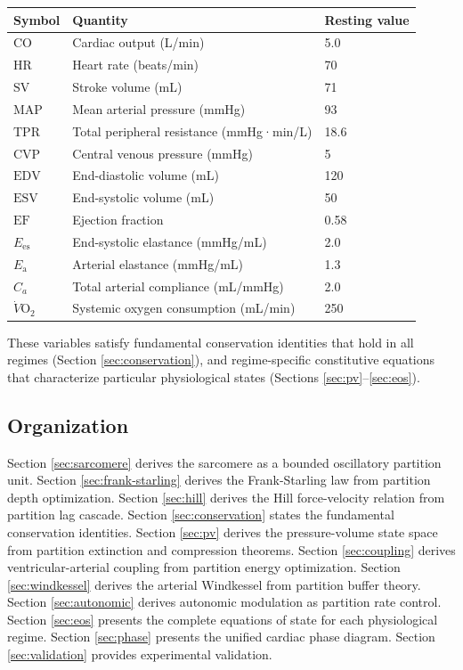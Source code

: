 \documentclass[10pt,twocolumn,a4paper]{article}
\theoremstyle{remark}
\newcommand{\Ees}{E_{\mathrm{es}}}
\newcommand{\Ea}{E_{\mathrm{a}}}
\newcommand{\CO}{\mathrm{CO}}
\newcommand{\SV}{\mathrm{SV}}
\newcommand{\HR}{\mathrm{HR}}
\newcommand{\MAP}{\mathrm{MAP}}
\newcommand{\TPR}{\mathrm{TPR}}
\newcommand{\CVP}{\mathrm{CVP}}
\newcommand{\EDV}{\mathrm{EDV}}
\newcommand{\ESV}{\mathrm{ESV}}
\newcommand{\EF}{\mathrm{EF}}
\begin{document}
\begin{center}
\begin{tabular}{lll}
\toprule
\textbf{Symbol} & \textbf{Quantity} & \textbf{Resting value} \\
\midrule
$\CO$ & Cardiac output (L/min) & 5.0 \\
$\HR$ & Heart rate (beats/min) & 70 \\
$\SV$ & Stroke volume (mL) & 71 \\
$\MAP$ & Mean arterial pressure (mmHg) & 93 \\
$\TPR$ & Total peripheral resistance (mmHg·min/L) & 18.6 \\
$\CVP$ & Central venous pressure (mmHg) & 5 \\
$\EDV$ & End-diastolic volume (mL) & 120 \\
$\ESV$ & End-systolic volume (mL) & 50 \\
$\EF$ & Ejection fraction & 0.58 \\
$\Ees$ & End-systolic elastance (mmHg/mL) & 2.0 \\
$\Ea$ & Arterial elastance (mmHg/mL) & 1.3 \\
$C_a$ & Total arterial compliance (mL/mmHg) & 2.0 \\
$\dot{V}\mathrm{O}_2$ & Systemic oxygen consumption (mL/min) & 250 \\
\bottomrule
\end{tabular}
\end{center}

These variables satisfy fundamental conservation identities that hold in all regimes (Section \ref{sec:conservation}), and regime-specific constitutive equations that characterize particular physiological states (Sections \ref{sec:pv}--\ref{sec:eos}).

\subsection{Organization}

Section \ref{sec:sarcomere} derives the sarcomere as a bounded oscillatory partition unit. Section \ref{sec:frank-starling} derives the Frank-Starling law from partition depth optimization. Section \ref{sec:hill} derives the Hill force-velocity relation from partition lag cascade. Section \ref{sec:conservation} states the fundamental conservation identities. Section \ref{sec:pv} derives the pressure-volume state space from partition extinction and compression theorems. Section \ref{sec:coupling} derives ventricular-arterial coupling from partition energy optimization. Section \ref{sec:windkessel} derives the arterial Windkessel from partition buffer theory. Section \ref{sec:autonomic} derives autonomic modulation as partition rate control. Section \ref{sec:eos} presents the complete equations of state for each physiological regime. Section \ref{sec:phase} presents the unified cardiac phase diagram. Section \ref{sec:validation} provides experimental validation.
\end{document}
